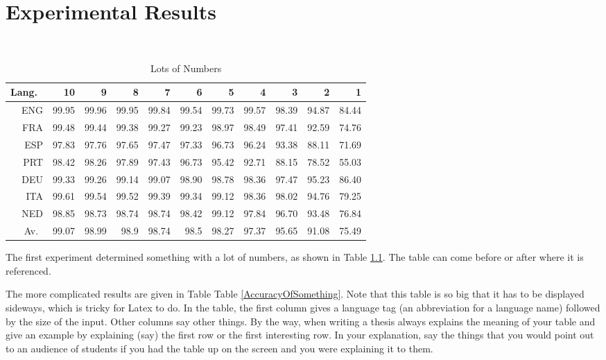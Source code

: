 %
%
%
% 
%

\chapter{Experimental Results}
\label{ExperimentalResults}

\begin{table}
\caption{Lots of Numbers}
\label {MyTable}
\\
\begin{tabular}{|r|r|r|r|r|r|r|r|r|r|r|}
\hline
Lang.\ & 10 & 9 & 8 & 7 & 6 & 5 & 4 & 3 & 2 & 1\\
\hline
ENG &	99.95 &	99.96 &	99.95 &	99.84 &	99.54 &	99.73 &	99.57 &	98.39 &	94.87 &	84.44\\
\hline
FRA &	99.48 &	99.44 &	99.38 &	99.27 &	99.23 &	98.97 &	98.49 &	97.41 &	92.59 &	74.76\\
\hline
ESP &	97.83 &	97.76 &	97.65 &	97.47 &	97.33 &	96.73 &	96.24 &	93.38 &	88.11 &	71.69\\
\hline
PRT &	98.42 &	98.26 &	97.89 &	97.43 &	96.73 &	95.42 &	92.71 &	88.15 &	78.52 &	55.03\\
\hline
DEU &	99.33 &	99.26 &	99.14 &	99.07 &	98.90 &	98.78 &	98.36 &	97.47 &	95.23 &	86.40\\
\hline
ITA &	99.61 &	99.54 &	99.52 &	99.39 &	99.34 &	99.12 &	98.36 &	98.02 &	94.76 &	79.25\\
\hline
NED &	98.85 &	98.73 &	98.74 &	98.74 &	98.42 &	99.12 &	97.84 &	96.70 &	93.48 &	76.84\\
\hline
Av.\	& 99.07	& 98.99	& 98.9	& 98.74	& 98.5	& 98.27	& 97.37	& 95.65	& 91.08	& 75.49\\
\hline
\end{tabular}
\end{table}

The first experiment determined something with a lot of numbers,
as shown in Table \ref{MyTable}.  The table can come before
or after where it is referenced.

The more complicated results are given in Table
Table \ref{AccuracyOfSomething}. 
Note that this table is so big that it has to
be displayed sideways, which is tricky for Latex to do.
In the table, the first column gives a language tag (an abbreviation for a language name) followed by the size of the input.  
Other columns say other things.  
By the way, when writing a thesis always explains the meaning of your
table and give an example by explaining (say) the first row or the
first interesting row.  In your explanation, say the things that 
you would point out to an audience of students
if you had the table up on the screen and you were explaining it
to them.

